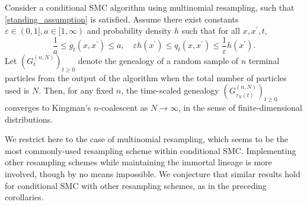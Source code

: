 \begin{corollary}\label{thm:CSMC}
Consider a conditional SMC algorithm using multinomial resampling, such that \ref{standing_assumption} is satisfied. Assume there exist constants $\varepsilon\in (0,1], a\in [1,\infty)$ and probability density $h$ such that for all $x, x^\prime, t$,
\begin{equation}\label{eq:gq_bounds_csmc}
\frac{1}{a} \leq g_t(x, x^\prime) \leq a , \quad
\varepsilon h(x^\prime) \leq q_t(x, x^\prime) \leq \frac{1}{\varepsilon} h(x^\prime) .
\end{equation}
Let $(G_t^{(n,N)})_{t\geq0}$ denote the genealogy of a random sample of $n$ terminal particles from the output of the algorithm when the total number of particles used is $N$. Then, for any fixed $n$, the time-scaled genealogy $(G_{\tau_N(t)}^{(n,N)})_{t\geq0}$ converges to Kingman's $n$-coalescent as $N\to \infty$, in the sense of finite-dimensional distributions.
\end{corollary}
We restrict here to the case of multinomial resampling, which seems to be the most commonly-used resampling scheme within conditional SMC. Implementing other resampling schemes while maintaining the immortal lineage is more involved, though by no means impossible.
We conjecture that similar results hold for conditional SMC with other resampling schemes, as in the preceding corollaries.


